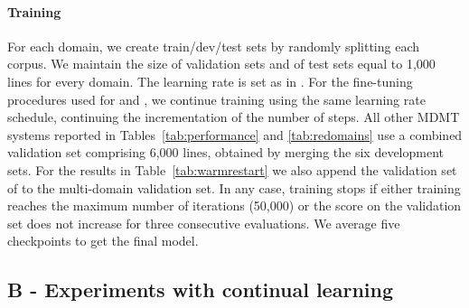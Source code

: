 \paragraph{Training} For each domain, we create train/dev/test sets by randomly splitting each corpus. We maintain the size of validation sets and of test sets equal to 1,000 lines for every domain.
The learning rate is set
as in \cite{Vaswani17attention}. For the fine-tuning procedures used for  and , we continue training using the same learning rate schedule, continuing the incrementation of the number of steps. All other MDMT systems reported in Tables~\ref{tab:performance} and \ref{tab:redomains} use a combined validation set comprising 6,000 lines, obtained by merging the six development sets. For the results in Table~\ref{tab:warmrestart} we also append the validation set of  to the multi-domain validation set. In any case, training stops if either training reaches the maximum number of iterations (50,000) or the score on the validation set does not increase for three consecutive evaluations. We average five checkpoints to get the final model.

\subsection*{B - Experiments with continual learning \label{ssec:full-continual}}

